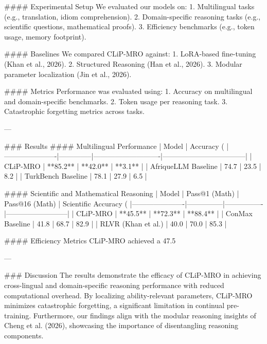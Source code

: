 #### Experimental Setup
We evaluated our models on:
1. Multilingual tasks (e.g., translation, idiom comprehension).
2. Domain-specific reasoning tasks (e.g., scientific questions, mathematical proofs).
3. Efficiency benchmarks (e.g., token usage, memory footprint).

#### Baselines
We compared CLiP-MRO against:
1. LoRA-based fine-tuning (Khan et al., 2026).
2. Structured Reasoning (Han et al., 2026).
3. Modular parameter localization (Jin et al., 2026).

#### Metrics
Performance was evaluated using:
1. Accuracy on multilingual and domain-specific benchmarks.
2. Token usage per reasoning task.
3. Catastrophic forgetting metrics across tasks.

---

### Results
#### Multilingual Performance
| Model                | Accuracy (%
|----------------------|--------------|----------------------------|-----------------------------------|
| CLiP-MRO             | **85.2**    | **42.0**                  | **3.1**                          |
| AfriqueLLM Baseline  | 74.7         | 23.5                      | 8.2                              |
| TurkBench Baseline   | 78.1         | 27.9                      | 6.5                              |

#### Scientific and Mathematical Reasoning
| Model                | Pass@1 (Math) | Pass@16 (Math) | Scientific Accuracy (%
|----------------------|---------------|----------------|--------------------------|
| CLiP-MRO             | **45.5**     | **72.3**       | **88.4**                |
| ConMax Baseline      | 41.8          | 68.7           | 82.9                    |
| RLVR (Khan et al.)   | 40.0          | 70.0           | 85.3                    |

#### Efficiency Metrics
CLiP-MRO achieved a 47.5%

---

### Discussion
The results demonstrate the efficacy of CLiP-MRO in achieving cross-lingual and domain-specific reasoning performance with reduced computational overhead. By localizing ability-relevant parameters, CLiP-MRO minimizes catastrophic forgetting, a significant limitation in continual pre-training. Furthermore, our findings align with the modular reasoning insights of Cheng et al. (2026), showcasing the importance of disentangling reasoning components.

